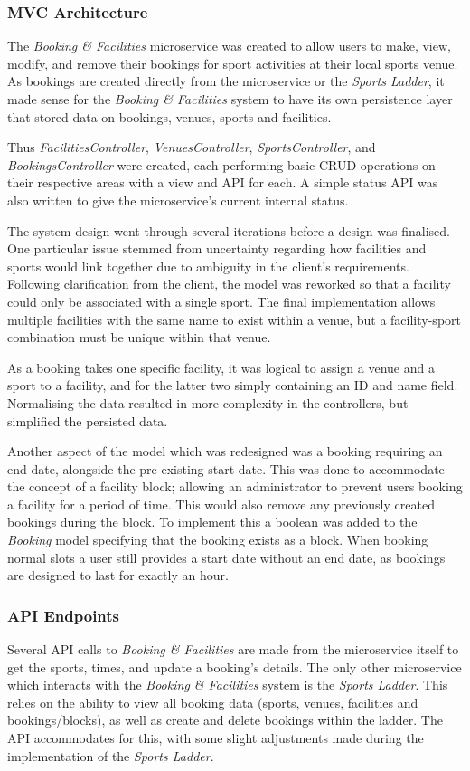 \subsubsection{MVC Architecture}
\par
The \textit{Booking \& Facilities} microservice was created to allow users to make, view, modify, and remove their bookings for sport activities at their local sports venue. As bookings are created directly from the microservice or the \textit{Sports Ladder}, it made sense for the \textit{Booking \& Facilities} system to have its own persistence layer that stored data on bookings, venues, sports and facilities. 
\par
Thus \textit{FacilitiesController}, \textit{VenuesController}, \textit{SportsController},  and \textit{BookingsController} were created, each performing basic CRUD operations on their respective areas with a view and API for each. A simple status API was also written to give the microservice's current internal status. 
\par 
The system design went through several iterations before a design was finalised. One particular issue stemmed from uncertainty regarding how facilities and sports would link together due to ambiguity in the client's requirements. Following clarification from the client, the model was reworked so that a facility could only be associated with a single sport. The final implementation allows multiple facilities with the same name to exist within a venue, but a facility-sport combination must be unique within that venue.
\par 
As a booking takes one specific facility, it was logical to assign a venue and a sport to a facility, and for the latter two simply containing an ID and name field. Normalising the data resulted in more complexity in the controllers, but simplified the persisted data.
\par
Another aspect of the model which was redesigned was a booking requiring an end date, alongside the pre-existing start date. This was done to accommodate the concept of a facility block; allowing an administrator to prevent users booking a facility for a period of time. This would also remove any previously created bookings during the block. To implement this a boolean was added to the \textit{Booking} model specifying that the booking exists as a block. When booking normal slots a user still provides a start date without an end date, as bookings are designed to last for exactly an hour.
\subsubsection{API Endpoints}
\par 
Several API calls to \textit{Booking \& Facilities} are made from the microservice itself to get the sports, times, and update a booking's details. The only other microservice which interacts with the \textit{Booking \& Facilities} system is the \textit{Sports Ladder}. This relies on the ability to view all booking data (sports, venues, facilities and bookings/blocks), as well as create and delete bookings within the ladder. The API accommodates for this, with some slight adjustments made during the implementation of the \textit{Sports Ladder}. 
